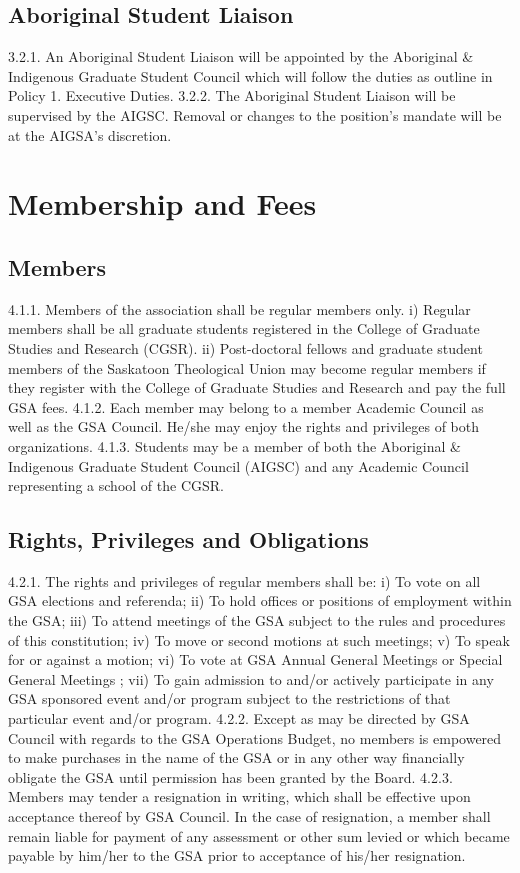 \subsection{Aboriginal Student Liaison}
3.2.1. An Aboriginal Student Liaison will be appointed by the Aboriginal \& 
Indigenous Graduate Student Council which will follow the duties as outline 
in Policy 1. Executive Duties. 
3.2.2. The Aboriginal Student Liaison will be supervised by the AIGSC. 
Removal or changes to the position’s mandate will be at the AIGSA’s 
discretion. 
\section{Membership and Fees }
\subsection{Members }
4.1.1. Members of the association shall be regular members only. 
i) Regular members shall be all graduate students registered in the 
College of Graduate Studies and Research (CGSR). 
ii) Post-doctoral fellows and graduate student members of the Saskatoon 
Theological Union may become regular members if they register with 
the College of Graduate Studies and Research and pay the full GSA 
fees. 
4.1.2. Each member may belong to a member Academic Council as well as 
the GSA Council. He/she may enjoy the rights and privileges of both 
organizations. 
4.1.3. Students may be a member of both the Aboriginal \& Indigenous 
Graduate Student Council (AIGSC) and any Academic Council 
representing a school of the CGSR. 
 
\subsection{Rights, Privileges and Obligations }
4.2.1. The rights and privileges of regular members shall be: 
i) To vote on all GSA elections and referenda; 
ii) To hold offices or positions of employment within the GSA; 
iii) To attend meetings of the GSA subject to the rules and procedures of 
this constitution; 
iv) To move or second motions at such meetings; 
v) To speak for or against a motion; 
vi) To vote at GSA Annual General Meetings or Special General 
Meetings ; 
vii) To gain admission to and/or actively participate in any GSA sponsored 
event and/or program subject to the restrictions of that particular event 
and/or program. 
4.2.2. Except as may be directed by GSA Council with regards to the GSA 
Operations Budget, no members is empowered to make purchases in 
the name of the GSA or in any other way financially obligate the GSA 
until permission has been granted by the Board. 
4.2.3. Members may tender a resignation in writing, which shall be effective 
upon acceptance thereof by GSA Council. In the case of resignation, a member shall remain liable for payment of any assessment or other 
sum levied or which became payable by him/her to the GSA prior to 
acceptance of his/her resignation. 
